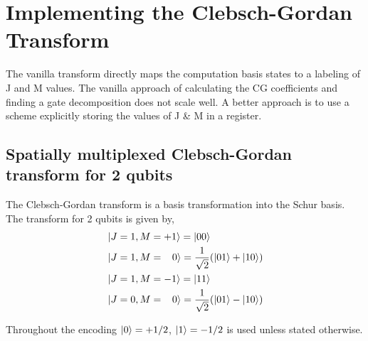 \documentclass[12pt]{article}
\begin{document}
\section{Implementing the Clebsch-Gordan Transform}

The vanilla transform directly maps the computation basis states to a labeling
of J and M values. The vanilla approach of calculating the CG coefficients and
finding a gate decomposition does not scale well. A better approach is to use a
scheme explicitly storing the values of J \& M in a register.

\subsection{Spatially multiplexed Clebsch-Gordan transform for 2 qubits}

The Clebsch-Gordan transform is a basis transformation into the Schur basis. The transform for 2 qubits is given by,
\begin{subequations}
\begin{align}
\begin{split}
&\left\vert{J=1, M=+1}\right\rangle = \left\vert{00}\right\rangle \\
&\left\vert{J=1, M=\;\;\;0}\right\rangle = \frac{1}{\sqrt{2}}(\left\vert{01}\right\rangle + \left\vert{10}\right\rangle) \\
&\left\vert{J=1, M=-1}\right\rangle = \left\vert{11}\right\rangle \\
\end{split}\\
\begin{split}
&\left\vert{J=0, M=\;\;\;0}\right\rangle = \frac{1}{\sqrt{2}}(\left\vert{01}\right\rangle - \left\vert{10}\right\rangle)\\
\end{split}
\end{align}
\end{subequations}

Throughout the encoding $\left\vert{0}\right\rangle=+1/2$, $\left\vert{1}\right\rangle=-1/2$ is used unless stated otherwise.
\end{document}
